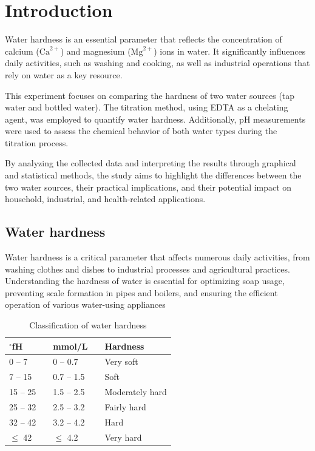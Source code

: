 \documentclass{article}
\begin{document}
\tableofcontents
\pagebreak

\section{Introduction}
Water hardness is an essential parameter that reflects the concentration of calcium (\(\text{Ca}^{2+}\)) and magnesium (\(\text{Mg}^{2+}\)) ions in water. It significantly influences daily activities, such as washing and cooking, as well as industrial operations that rely on water as a key resource. 

This experiment focuses on comparing the hardness of two water sources (tap water and bottled water). The titration method, using EDTA as a chelating agent, was employed to quantify water hardness. Additionally, pH measurements were used to assess the chemical behavior of both water types during the titration process.

By analyzing the collected data and interpreting the results through graphical and statistical methods, the study aims to highlight the differences between the two water sources, their practical implications, and their potential impact on household, industrial, and health-related applications.

\subsection{Water hardness}
Water hardness is a critical parameter that affects numerous daily activities, from washing
clothes and dishes to industrial processes and agricultural practices. Understanding the
hardness of water is essential for optimizing soap usage, preventing scale formation in
pipes and boilers, and ensuring the efficient operation of various water-using appliances

\vspace*{.5cm}
\begin{table}[h!]
    \centering
    \caption{Classification of water hardness}
    \begin{tabular}{@{}lclcl@{}}
    \toprule
    \textbf{$^\circ$fH} & & \textbf{mmol/L} & & \textbf{Hardness}\\
    \midrule
    0 -- 7 & & 0 -- 0.7 & & Very soft\\ 
    7 -- 15 & & 0.7 -- 1.5 & & Soft\\ 
    15 -- 25 & & 1.5 -- 2.5 & & Moderately hard\\ 
    25 -- 32 & & 2.5 -- 3.2 & & Fairly hard\\ 
    32 -- 42 & & 3.2 -- 4.2 & & Hard\\ 
    $\leq$ 42 & & $\leq$ 4.2 & & Very hard\\
    \bottomrule
    \end{tabular}
    \label{tab:water-hardness}
\end{table}
\end{document}
